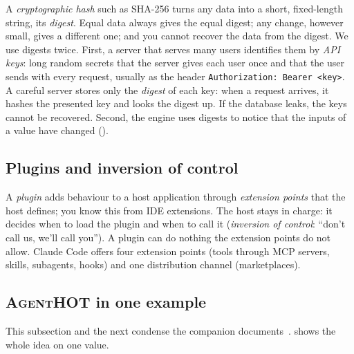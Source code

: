 \documentclass[10pt,a4paper]{article}
\newcommand{\tool}{\textsc{AgentHOT}}
\newcommand{\cc}{Claude Code}
\newcommand{\code}[1]{\texttt{#1}}
\begin{document}
A \emph{cryptographic hash} such as SHA-256 turns any data into a short,
fixed-length string, its \emph{digest}. Equal data always gives the equal
digest; any change, however small, gives a different one; and you cannot
recover the data from the digest. We use digests twice. First, a server
that serves many users identifies them by \emph{API keys}: long random
secrets that the server gives each user once and that the user sends with
every request, usually as the header \code{Authorization: Bearer <key>}. A
careful server stores only the \emph{digest} of each key: when a request
arrives, it hashes the presented key and looks the digest up. If the
database leaks, the keys cannot be recovered. Second, the engine uses
digests to notice that the inputs of a value have changed
().

\subsection{Plugins and inversion of control}

A \emph{plugin} adds behaviour to a host application through
\emph{extension points} that the host defines; you know this from IDE
extensions. The host stays in charge: it decides when to load the plugin and
when to call it (\emph{inversion of control}: ``don't call us, we'll call
you''). A plugin can do nothing the extension points do not allow. \cc{}
offers four extension points (tools through MCP servers, skills, subagents,
hooks) and one distribution channel (marketplaces).

\subsection{\tool{} in one example}\label{sec:recap-agenthot}

This subsection and the next condense the companion
documents~\cite{agenthot2026,autom2mteaching}.  shows the
whole idea on one value.
\end{document}
